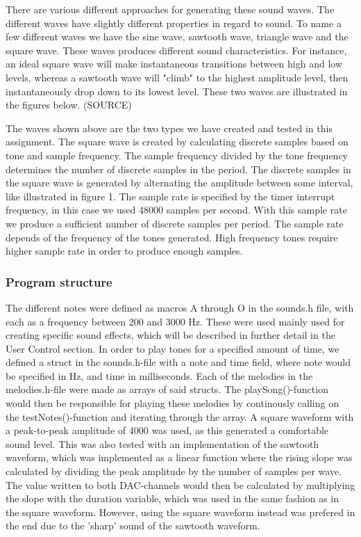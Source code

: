 There are various different approaches for generating these sound waves. The different waves have slightly different properties in regard to sound. To name a few different waves we have the sine wave, sawtooth wave, triangle wave and the square wave. These waves produces different sound characteristics. For instance, an ideal square wave will make instantaneous transitions between high and low levels, whereas a sawtooth wave will "climb" to the highest amplitude level, then instantaneously drop down to its lowest level. These two waves are illustrated in the figures below. (SOURCE)




The waves shown above are the two types we have created and tested in this assignment. The square wave is created by calculating discrete samples based on tone and sample frequency. The sample frequency divided by the tone frequency determines the number of discrete samples in the period. The discrete samples in the square wave is generated by alternating the amplitude between some interval, like illustrated in figure 1. The sample rate is specified by the timer interrupt frequency, in this case we used 48000 samples per second. With this sample rate we produce a sufficient number of discrete samples per period. The sample rate depends of the frequency of the tones generated. High frequency tones require higher sample rate in order to produce enough samples. 

 

\subsubsection{Program structure}

The different notes were defined as macros A through O in the sounds.h file, with each as a frequency between 200 and 3000 Hz. These were used mainly used for creating specific sound effects, which will be described in further detail in the User Control section.
	In order to play tones for a specified amount of time, we defined a struct in the sounds.h-file with a note and time field, where note would be specified in Hz, and time in milliseconds. Each of the melodies in the melodies.h-file were made as arrays of said structs. The playSong()-function would then be responsible for playing these melodies by continously calling on the testNotes()-function and iterating through the array. A square waveform with a peak-to-peak amplitude of 4000 was used, as this generated a comfortable sound level. This was also tested with an implementation of the sawtooth waveform, which was implemented as a linear function where the rising slope was calculated by dividing the peak amplitude by the number of samples per wave. The value written to both DAC-channels would then be calculated by multiplying the slope with the duration variable, which was used in the same fashion as in the square waveform. However, using the square waveform instead was prefered in the end due to the 'sharp' sound of the sawtooth waveform.

